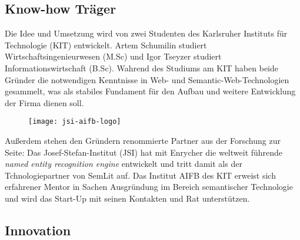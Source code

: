 
\subsection{Know-how Träger}
Die Idee und Umsetzung wird von zwei Studenten des Karlsruher Instituts für Technologie (KIT) entwickelt. {\color{orange}Artem Schumilin} studiert Wirtschaftsingenieurwesen (M.Sc) und {\color{orange}Igor Tseyzer} studiert Informationswirtschaft (B.Sc). Wahrend des Studiums am KIT haben beide Gründer die notwendigen Kenntnisse in Web- und Semantic-Web-Technologien gesammelt, was als stabiles Fundament für den Aufbau und weitere Entwicklung der Firma dienen soll. 
\begin{figure}[h!]
\centering
\texttt{[image: jsi-aifb-logo]}
\end{figure}

Außerdem stehen den Gründern renommierte Partner aus der Forschung zur Seite: 
Das Josef-Stefan-Institut (JSI) hat mit Enrycher die weltweit führende \emph{named entity recognition engine} entwickelt und tritt damit als der Tchnologiepartner von SemLit auf. 
Das Institut AIFB des KIT erweist sich erfahrener Mentor in Sachen Ausgründung im Bereich semantischer Technologie und wird das Start-Up mit seinen Kontakten und Rat unterstützen.


\subsection{Innovation}

